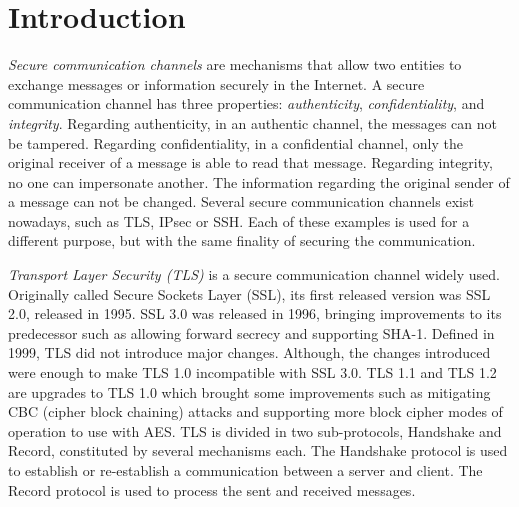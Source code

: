\documentclass{sig-alternate-05-2015}
\begin{document}

%
%

%
%
\printccsdesc



\section{Introduction}

\textit{Secure communication channels} are mechanisms that allow two entities to exchange messages or information securely in the Internet.
A secure communication channel has three properties: \textit{authenticity}, \textit{confidentiality}, and \textit{integrity}. Regarding authenticity, in an authentic channel, the messages can not be tampered. Regarding confidentiality, in a confidential channel, only the original receiver of a message is able to read that message. Regarding integrity, no one can impersonate another. The information regarding the original sender of a message can not be changed.
Several secure communication channels exist nowadays, such as TLS, IPsec or SSH. Each of these examples is used for a different purpose, but with the same finality of securing the communication.

\textit{Transport Layer Security (TLS)} is a secure communication channel widely used. Originally called Secure Sockets Layer (SSL), its first released version was SSL 2.0, released in 1995. SSL 3.0 was released in 1996, bringing improvements to its predecessor such as allowing forward secrecy and supporting SHA-1.
Defined in 1999, TLS did not introduce major changes. Although, the changes introduced were enough to make TLS 1.0 incompatible with SSL 3.0.
TLS 1.1 and TLS 1.2 are upgrades to TLS 1.0 which brought some improvements such as mitigating CBC (cipher block chaining) attacks and supporting more block cipher modes of operation to use with AES.
TLS is divided in two sub-protocols, Handshake and Record, constituted by several mechanisms each.
The Handshake protocol is used to establish or re-establish a communication between a server and client. The Record protocol is used to process the sent and received messages.
\end{document}
